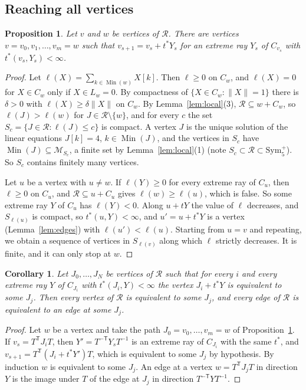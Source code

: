 \documentclass[11pt]{amsart}
\newtheorem{proposition}[theorem]{Proposition}
\newtheorem{corollary}[theorem]{Corollary}
\theoremstyle{definition}
\theoremstyle{remark}
\numberwithin{equation}{section}
\numberwithin{table}{section}
\numberwithin{figure}{section}
\newcommand{\M}{\mathcal{M}}
\newcommand{\Rk}{\mathcal{R}}
\newcommand{\Sym}{\mathrm{Sym}}
\newcommand{\Min}{\operatorname{Min}}
\begin{document}
\subsection{Reaching all vertices}

\begin{proposition}\label{prop:connected}
Let $v$ and $w$ be vertices of $\Rk$. There are vertices $v=v_0,v_1,\dots,v_m=w$ such that $v_{s+1}=v_s+t^*Y_s$ for an extreme ray $Y_s$ of $C_{v_s}$ with $t^*(v_s,Y_s)<\infty$.
\end{proposition}

\begin{proof}
Let $\ell(X)=\sum_{k\in\Min(w)}X[k]$. Then $\ell\ge0$ on $C_w$, and $\ell(X)=0$ for $X\in C_w$ only if $X\in L_w=0$. By compactness of $\{X\in C_w:\|X\|=1\}$ there is $\delta>0$ with $\ell(X)\ge\delta\|X\|$ on $C_w$. By Lemma~\ref{lem:local}(3), $\Rk\subseteq w+C_w$, so $\ell(J)>\ell(w)$ for $J\in\Rk\setminus\{w\}$, and for every $c$ the set $S_c=\{J\in\Rk:\ell(J)\le c\}$ is compact. A vertex $J$ is the unique solution of the linear equations $J[k]=4$, $k\in\Min(J)$, and the vertices in $S_c$ have $\Min(J)\subseteq\M_{S_c}$, a finite set by Lemma~\ref{lem:local}(1) (note $S_c\subset\Rk\subset\Sym_5^+$). So $S_c$ contains finitely many vertices.

Let $u$ be a vertex with $u\ne w$. If $\ell(Y)\ge0$ for every extreme ray of $C_u$, then $\ell\ge0$ on $C_u$, and $\Rk\subseteq u+C_u$ gives $\ell(w)\ge\ell(u)$, which is false. So some extreme ray $Y$ of $C_u$ has $\ell(Y)<0$. Along $u+tY$ the value of $\ell$ decreases, and $S_{\ell(u)}$ is compact, so $t^*(u,Y)<\infty$, and $u'=u+t^*Y$ is a vertex (Lemma~\ref{lem:edges}) with $\ell(u')<\ell(u)$. Starting from $u=v$ and repeating, we obtain a sequence of vertices in $S_{\ell(v)}$ along which $\ell$ strictly decreases. It is finite, and it can only stop at $w$.
\end{proof}

\begin{corollary}\label{cor:closure}
Let $J_0,\dots,J_N$ be vertices of $\Rk$ such that for every $i$ and every extreme ray $Y$ of $C_{J_i}$ with $t^*(J_i,Y)<\infty$ the vertex $J_i+t^*Y$ is equivalent to some $J_j$. Then every vertex of $\Rk$ is equivalent to some $J_j$, and every edge of $\Rk$ is equivalent to an edge at some $J_j$.
\end{corollary}

\begin{proof}
Let $w$ be a vertex and take the path $J_0=v_0,\dots,v_m=w$ of Proposition~\ref{prop:connected}. If $v_s=T^{\mathsf T}J_iT$, then $Y'=T^{-\mathsf T}Y_sT^{-1}$ is an extreme ray of $C_{J_i}$ with the same $t^*$, and $v_{s+1}=T^{\mathsf T}(J_i+t^*Y')T$, which is equivalent to some $J_j$ by hypothesis. By induction $w$ is equivalent to some $J_j$. An edge at a vertex $w=T^{\mathsf T}J_jT$ in direction $Y$ is the image under $T$ of the edge at $J_j$ in direction $T^{-\mathsf T}YT^{-1}$.
\end{proof}
\end{document}

